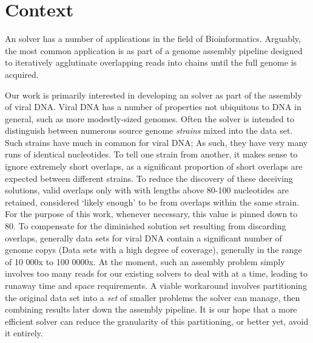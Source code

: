 \section{Context}
\label{context}

An \aspop{} solver has a number of applications in the field of Bioinformatics. Arguably, the most common application is as part of a genome assembly pipeline designed to iteratively agglutinate overlapping reads into chains until the full genome is acquired.

Our work is primarily interested in developing an \aspop{} solver as part of the assembly of viral DNA. Viral DNA has a number of properties not ubiquitous to DNA in general, such as more modestly-sized genomes. Often the solver is intended to distinguish between numerous \gls{source genome} \textit{strains} mixed into the data set. Such strains have much in common for viral DNA; As such, they have very many runs of identical nucleotides. To tell one strain from another, it makes sense to ignore extremely short overlaps, as a significant proportion of short overlaps are expected between different strains. To reduce the discovery of these deceiving solutions, valid overlaps  only with with lengths above 80-100 nucleotides are retained, considered `likely enough' to be from overlaps within the same strain. For the purpose of this work, whenever necessary, this value is pinned down to 80. To compensate for the diminished solution set resulting from discarding overlaps, generally data sets for viral DNA contain a significant number of \glspl{genome copy} (Data sets with a high degree of \gls{coverage}), generally in the range of 10 000x to 100 0000x. At the moment, such an assembly problem simply involves too many reads for our existing \aspop{} solvers to deal with at a time, leading to runaway time and space requirements. A viable workaround involves partitioning the original data set into a \textit{set} of smaller problems the \aspop{} solver can manage, then combining results later down the assembly pipeline. It is our hope that a more efficient \aspop{} solver can reduce the granularity of this partitioning, or better yet, avoid it entirely.
